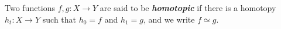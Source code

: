 \documentclass[preview]{standalone}
\begin{document}
\begin{center}
Two functions $f,g : X\to Y$ are said to be \textbf{\textit{homotopic}} if there is a homotopy $h_t : X\to Y$ such that $h_0=f$ and $h_1=g$, and we write $f\simeq g$.
\end{center}
\end{document}
